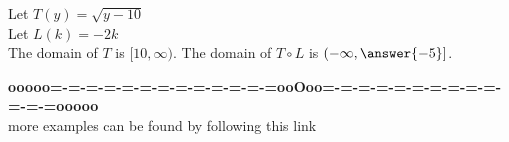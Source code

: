 \documentclass{ximera}
\begin{document}
\begin{question}


Let $T(y) = \sqrt{y-10}$ \\

Let $L(k) = -2k$ \\


The domain of $T$ is $[10, \infty)$.  The domain of $T \circ L$ is $\left( -\infty, \answer{-5} \right]$.


\end{question}
















\begin{center}
\textbf{\textcolor{green!50!black}{ooooo=-=-=-=-=-=-=-=-=-=-=-=-=ooOoo=-=-=-=-=-=-=-=-=-=-=-=-=ooooo}} \\

more examples can be found by following this link\\ 

\end{center}
\end{document}

